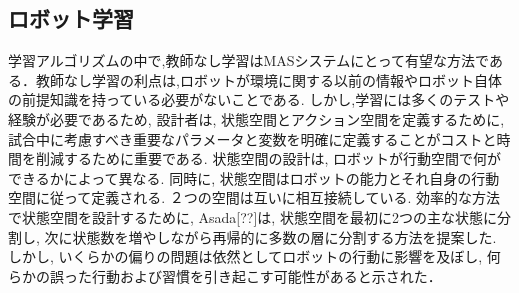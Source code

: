 \subsection{ロボット学習}
学習アルゴリズムの中で,教師なし学習はMASシステムにとって有望な方法である．教師なし学習の利点は,ロボットが環境に関する以前の情報やロボット自体の前提知識を持っている必要がないことである. しかし,学習には多くのテストや経験が必要であるため, 設計者は, 状態空間とアクション空間を定義するために, 試合中に考慮すべき重要なパラメータと変数を明確に定義することがコストと時間を削減するために重要である. 状態空間の設計は, ロボットが行動空間で何ができるかによって異なる. 同時に, 状態空間はロボットの能力とそれ自身の行動空間に従って定義される. ２つの空間は互いに相互接続している. 効率的な方法で状態空間を設計するために, Asada[??]は, 状態空間を最初に2つの主な状態に分割し, 次に状態数を増やしながら再帰的に多数の層に分割する方法を提案した. しかし, いくらかの偏りの問題は依然としてロボットの行動に影響を及ぼし, 何らかの誤った行動および習慣を引き起こす可能性があると示された．

